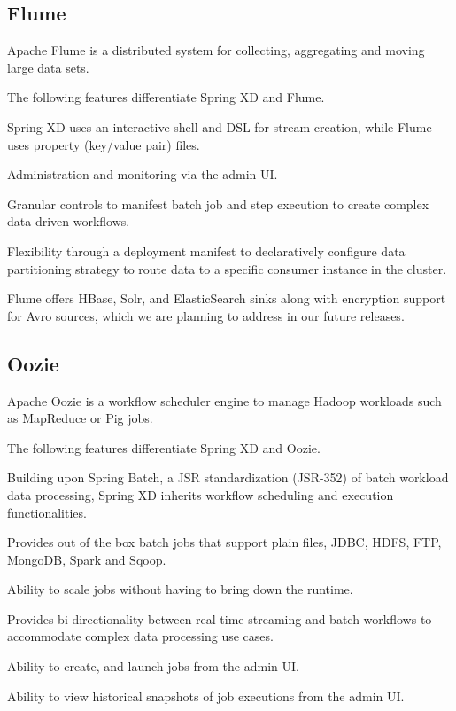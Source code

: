 \subsection{Flume}
Apache Flume\cite{flume} is a distributed system for collecting, aggregating and
moving large data sets.

The following features differentiate Spring XD and Flume.

\begin{itemize*}
\item Spring XD uses an interactive shell and DSL for stream creation,
while Flume uses property (key/value pair) files.
\item Administration and monitoring via the admin UI.
\item Granular controls to manifest batch job and step execution to create
complex data driven workflows.
\item Flexibility through a deployment manifest to declaratively configure data
partitioning strategy to route data to a specific consumer instance in the cluster.
\end{itemize*}

Flume offers HBase, Solr, and ElasticSearch sinks along with encryption support
for Avro sources, which we are planning to address in our future releases.

\subsection{Oozie}
Apache Oozie\cite{oozie} is a workflow scheduler engine to manage Hadoop \cite{hadoop}
workloads such as MapReduce or Pig jobs.

The following features differentiate Spring XD and Oozie.

\begin{itemize*}
\item Building upon Spring Batch, a JSR standardization (JSR-352) of batch
workload data processing, Spring XD inherits workflow scheduling and execution
functionalities.
\item Provides out of the box batch jobs that support plain files, JDBC, HDFS,
FTP, MongoDB, Spark and Sqoop.
\item Ability to scale jobs without having to bring down the runtime.
\item Provides bi-directionality between real-time streaming and batch
workflows to accommodate complex data processing use cases.
\item Ability to create, and launch jobs from the admin UI.
\item Ability to view historical snapshots of job executions from the admin UI.
\end{itemize*}


